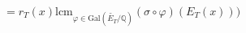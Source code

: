 \documentclass[preview]{standalone}
\begin{document}
\begin{center}
$= r_T(x)\text{lcm}_{\varphi \in \text{Gal}\left(\widetilde{E_T}/\mathbb{Q}\right)} (\sigma \circ \varphi)(E_T(x)))$
\end{center}
\end{document}
